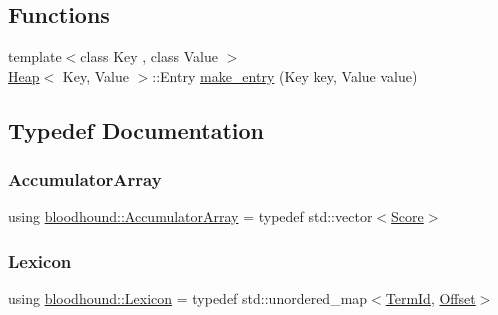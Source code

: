 \subsection*{Functions}
\begin{DoxyCompactItemize}
\item 
{\footnotesize template$<$class Key , class Value $>$ }\\\hyperlink{classbloodhound_1_1Heap}{Heap}$<$ Key, Value $>$\+::Entry \hyperlink{namespacebloodhound_a64cca068dad32570cb036b6057cc86b6}{make\+\_\+entry} (Key key, Value value)
\end{DoxyCompactItemize}


\subsection{Typedef Documentation}
\mbox{\label{namespacebloodhound_ae863daa54e3092bd2bc335e70f7a9dd7}} 
\subsubsection{\texorpdfstring{Accumulator\+Array}{AccumulatorArray}}
{\footnotesize\ttfamily using \hyperlink{namespacebloodhound_ae863daa54e3092bd2bc335e70f7a9dd7}{bloodhound\+::\+Accumulator\+Array} = typedef std\+::vector$<$\hyperlink{structbloodhound_1_1Score}{Score}$>$}

\mbox{\label{namespacebloodhound_a94032a3533df0a1b6d3435bad57e6499}} 
\subsubsection{\texorpdfstring{Lexicon}{Lexicon}}
{\footnotesize\ttfamily using \hyperlink{namespacebloodhound_a94032a3533df0a1b6d3435bad57e6499}{bloodhound\+::\+Lexicon} = typedef std\+::unordered\+\_\+map$<$\hyperlink{structbloodhound_1_1TermId}{Term\+Id}, \hyperlink{structbloodhound_1_1Offset}{Offset}$>$}

\mbox{\label{namespacebloodhound_a687d80c6f992eba8b820bf30a482f4b4}} 
